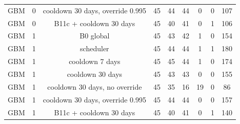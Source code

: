 \documentclass[10pt,onecolumn,letterpaper]{article}
\begin{document}
\begin{table}[!t]
{\begin{tabular}{lcccccccc}
GBM & 0 & cooldown 30 days, override 0.995 & 45 & 44 & 44 & 0 & 0 & 107 \\
GBM & 0 & B11c + cooldown 30 days & 45 & 40 & 41 & 0 & 1 & 106 \\
GBM & 1 & B0 global & 45 & 43 & 42 & 1 & 0 & 154 \\
GBM & 1 & scheduler & 45 & 44 & 44 & 1 & 1 & 180 \\
GBM & 1 & cooldown 7 days & 45 & 45 & 44 & 1 & 0 & 174 \\
GBM & 1 & cooldown 30 days & 45 & 43 & 43 & 0 & 0 & 155 \\
GBM & 1 & cooldown 30 days, no override & 45 & 35 & 16 & 19 & 0 & 86 \\
GBM & 1 & cooldown 30 days, override 0.995 & 45 & 44 & 44 & 0 & 0 & 157 \\
GBM & 1 & B11c + cooldown 30 days & 45 & 40 & 41 & 0 & 1 & 140 \\
\bottomrule
\end{tabular}}
\end{table}
\end{document}
